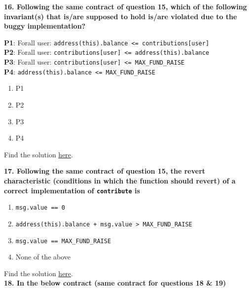 \textbf{16. Following the same contract of question 15, which of the following invariant(s) that is/are supposed to hold is/are violated due to the buggy implementation?}

\textbf{P1}: Forall user: \verb|address(this).balance <= contributions[user]|\\
\textbf{P2}: Forall user: \verb|contributions[user] <= address(this).balance|\\
\textbf{P3}: Forall user: \verb|contributions[user] <= MAX_FUND_RAISE|\\
\textbf{P4}: \verb|address(this).balance <= MAX_FUND_RAISE|

\begin{enumerate}[label=\Alph*.]
    \item P1
    \item P2
    \item P3
    \item P4
\end{enumerate}

Find the solution \hyperref[sec:raceXcertora_q16]{here}.\\

\pagebreak

\textbf{17. Following the same contract of question 15, the revert characteristic (conditions in which the function should revert) of a correct implementation of \texttt{contribute} is}

\begin{enumerate}[label=\Alph*.]
    \item\verb|msg.value == 0|
    \item\verb|address(this).balance + msg.value > MAX_FUND_RAISE|
    \item\verb|msg.value == MAX_FUND_RAISE|
    \item None of the above
\end{enumerate}

Find the solution \hyperref[sec:raceXcertora_q17]{here}.\\

\textbf{18. In the below contract (same contract for questions 18 \& 19)}

